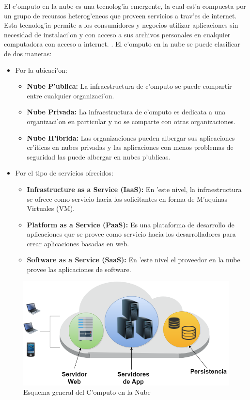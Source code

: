 El c'omputo en la nube es una tecnolog'ia emergente, la cual est'a compuesta por un grupo de recursos heterog'eneos que proveen servicios a trav'es de internet. \cite{agarwal2014efficient} 
Esta tecnolog'ia permite a los consumidores y negocios utilizar aplicaciones sin necesidad de instalaci'on y con acceso a sus archivos personales en cualquier computadora con acceso a internet. \cite{ahmed2012advanced}. 
El c'omputo en la nube se puede clasificar de dos maneras:
\begin{itemize}
\item Por la ubicaci'on: \cite{ahmed2012advanced}  
	\begin{itemize}
	\item \textbf{Nube P'ublica:} La infraestructura de c'omputo se puede compartir entre cualquier organizaci'on.
	\item \textbf{Nube Privada:} La infraestructura de c'omputo es dedicata a una organizaci'on en particular y no se comparte con otras organizaciones.
	\item \textbf{Nube H'ibrida:} Las organizaciones pueden albergar sus aplicaciones cr'iticas en nubes privadas y las aplicaciones con menos problemas de seguridad las puede albergar en nubes p'ublicas.
	\end{itemize}
\item Por el tipo de servicios ofrecidos: \cite{agarwal2014efficient}
	\begin{itemize}
	\item \textbf{Infrastructure as a Service (IaaS):} En 'este nivel, la infraestructura se ofrece como servicio hacia los solicitantes en forma de M'aquinas Virtuales (VM).
	\item \textbf{Platform as a Service (PaaS):} Es una plataforma de desarrollo de aplicaciones que se provee como servicio hacia los desarrolladores para crear aplicaciones basadas en web.
	\item \textbf{Software as a Service (SaaS):} En 'este nivel el proveedor en la nube provee las aplicaciones de software.
	\end{itemize}
\end{itemize}



\begin{figure}
	\caption{Esquema general del C'omputo en la Nube}
	\centering
	\includegraphics[scale=0.5]{media/cloud1}
\end{figure}
